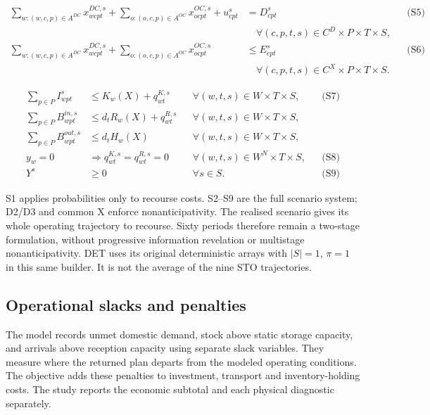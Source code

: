 \documentclass[
  english,
  11pt,
  a4paper,
  authoryear,
  preprint]{elsarticle}
\begin{document}
\[
\begin{aligned}
\sum_{w:(w,c,p)\in A^{DC}}x^{DC,s}_{wcpt}
 +\sum_{o:(o,c,p)\in A^{OC}}x^{OC,s}_{ocpt}+u^s_{cpt}
 &=D^s_{cpt} &&\text{(S5)}\\
 &\quad\forall(c,p,t,s)\in C^D\times P\times T\times S,\\
\sum_{w:(w,c,p)\in A^{DC}}x^{DC,s}_{wcpt}
 +\sum_{o:(o,c,p)\in A^{OC}}x^{OC,s}_{ocpt}
 &\le E^s_{cpt} &&\text{(S6)}\\
 &\quad\forall(c,p,t,s)\in C^X\times P\times T\times S.
\end{aligned}
\]

\[
\begin{aligned}
\sum_{p\in P}I^s_{wpt}&\le K_w(X)+q^{K,s}_{wt}
 &&\forall(w,t,s)\in W\times T\times S, &&\text{(S7)}\\
\sum_{p\in P}B^{in,s}_{wpt}&\le d_tR_w(X)+q^{R,s}_{wt}
 &&\forall(w,t,s)\in W\times T\times S,\\
\sum_{p\in P}B^{out,s}_{wpt}&\le d_tH_w(X)
 &&\forall(w,t,s)\in W\times T\times S,\\
y_w=0&\Longrightarrow q^{K,s}_{wt}=q^{R,s}_{wt}=0
 &&\forall(w,t,s)\in W^N\times T\times S, &&\text{(S8)}\\
Y^s&\ge0 &&\forall s\in S. &&\text{(S9)}
\end{aligned}
\]

S1 applies probabilities only to recourse costs. S2--S9 are the full
scenario system; D2/D3 and common X enforce nonanticipativity. The
realised scenario gives its whole operating trajectory to recourse.
Sixty periods therefore remain a two-stage formulation, without
progressive information revelation or multistage nonanticipativity. DET
uses its original deterministic arrays with \(|S|=1\), \(\pi=1\) in this
same builder. It is not the average of the nine STO trajectories.

\subsection{Operational slacks and
penalties}\label{operational-slacks-and-penalties}

The model records unmet domestic demand, stock above static storage
capacity, and arrivals above reception capacity using separate slack
variables. They measure where the returned plan departs from the modeled
operating conditions. The objective adds these penalties to investment,
transport and inventory-holding costs. The study reports the economic subtotal
and each physical diagnostic separately.
\end{document}
